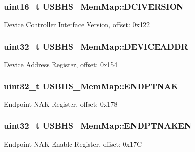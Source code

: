 \subsubsection[{D\+C\+I\+V\+E\+R\+S\+I\+O\+N}]{\setlength{\rightskip}{0pt plus 5cm}uint16\+\_\+t U\+S\+B\+H\+S\+\_\+\+Mem\+Map\+::\+D\+C\+I\+V\+E\+R\+S\+I\+O\+N}\label{struct_u_s_b_h_s___mem_map_ac033788854eae485a1d9a238c06abcdc}
Device Controller Interface Version, offset\+: 0x122 \hypertarget{struct_u_s_b_h_s___mem_map_a1c6faf55365b2399ddb69d8a7d76d63d}{}
\subsubsection[{D\+E\+V\+I\+C\+E\+A\+D\+D\+R}]{\setlength{\rightskip}{0pt plus 5cm}uint32\+\_\+t U\+S\+B\+H\+S\+\_\+\+Mem\+Map\+::\+D\+E\+V\+I\+C\+E\+A\+D\+D\+R}\label{struct_u_s_b_h_s___mem_map_a1c6faf55365b2399ddb69d8a7d76d63d}
Device Address Register, offset\+: 0x154 \hypertarget{struct_u_s_b_h_s___mem_map_abc277089be0f8b1082f3d4399500c7f9}{}
\subsubsection[{E\+N\+D\+P\+T\+N\+A\+K}]{\setlength{\rightskip}{0pt plus 5cm}uint32\+\_\+t U\+S\+B\+H\+S\+\_\+\+Mem\+Map\+::\+E\+N\+D\+P\+T\+N\+A\+K}\label{struct_u_s_b_h_s___mem_map_abc277089be0f8b1082f3d4399500c7f9}
Endpoint N\+A\+K Register, offset\+: 0x178 \hypertarget{struct_u_s_b_h_s___mem_map_adb6f3f5cdd6d92db2e6342093a6b1217}{}
\subsubsection[{E\+N\+D\+P\+T\+N\+A\+K\+E\+N}]{\setlength{\rightskip}{0pt plus 5cm}uint32\+\_\+t U\+S\+B\+H\+S\+\_\+\+Mem\+Map\+::\+E\+N\+D\+P\+T\+N\+A\+K\+E\+N}\label{struct_u_s_b_h_s___mem_map_adb6f3f5cdd6d92db2e6342093a6b1217}
Endpoint N\+A\+K Enable Register, offset\+: 0x17\+C \hypertarget{struct_u_s_b_h_s___mem_map_a6e662d447a64545a849155847fd1850d}{}
